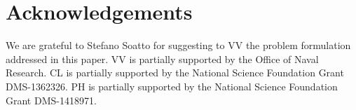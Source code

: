 \documentclass[11pt]{article}
\begin{document}
%
%
%
%
%
%
%
%

\section*{Acknowledgements}
We are grateful to Stefano Soatto for suggesting to VV the problem formulation addressed in this paper. VV is partially supported by the Office of Naval Research.  CL is partially supported by the National Science Foundation Grant DMS-1362326. PH is partially supported by the National Science Foundation Grant DMS-1418971.


\end{document}
